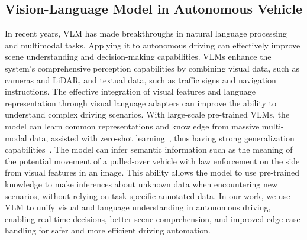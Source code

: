 \subsection{Vision-Language Model in Autonomous Vehicle}
In recent years, VLM has made breakthroughs in natural language processing and multimodal tasks\cite{cui2023drivellm, Renz2024CarLLaVA}. Applying it to autonomous driving can effectively improve scene understanding and decision-making capabilities\cite{zhou2024vision, Pan2024VLP}.
VLMs enhance the system’s comprehensive perception capabilities by combining visual data, such as cameras and LiDAR, and textual data, such as traffic signs and navigation instructions\cite{Wen2023On,zheng2024simplellm4ad,zhang2022learning}. The effective integration of visual features and language representation through visual language adapters can improve the ability to understand complex driving scenarios\cite{xu2024drivegpt4}.
With large-scale pre-trained VLMs, the model can learn common representations and knowledge from massive multi-modal data, assisted with zero-shot learning~\cite{wang2024solving, kojima2022large}, thus having strong generalization capabilities~\cite{rocamonde2023vision, Wei2022Semantic}. The model can infer semantic information such as the meaning of the potential movement of a pulled-over vehicle with law enforcement on the side from visual features in an image\cite{Su2024To}. This ability allows the model to use pre-trained knowledge to make inferences about unknown data when encountering new scenarios, without relying on task-specific annotated data\cite{gouidis2024fusing}.
In our work, we use VLM to unify visual and language understanding in autonomous driving, enabling real-time decisions, better scene comprehension, and improved edge case handling for safer and more efficient driving automation.

